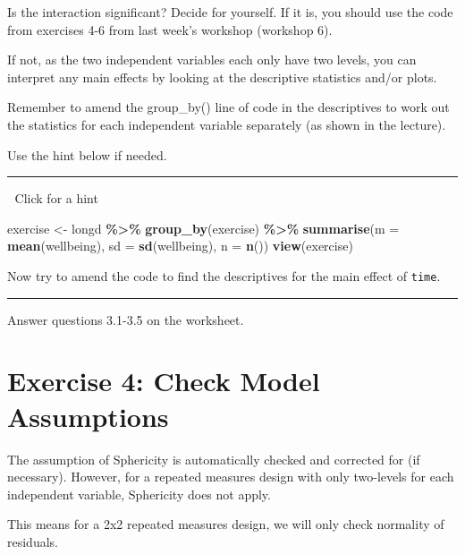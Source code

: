 \documentclass[
]{book}
\newenvironment{Shaded}{\begin{snugshade}}{\end{snugshade}}
\newcommand{\AttributeTok}[1]{\textcolor[rgb]{0.13,0.29,0.53}{#1}}
\newcommand{\FunctionTok}[1]{\textcolor[rgb]{0.13,0.29,0.53}{\textbf{#1}}}
\newcommand{\NormalTok}[1]{#1}
\newcommand{\OtherTok}[1]{\textcolor[rgb]{0.56,0.35,0.01}{#1}}
\newcommand{\SpecialCharTok}[1]{\textcolor[rgb]{0.81,0.36,0.00}{\textbf{#1}}}
\let\oldsection\section
\renewcommand{\section}{\needspace{5\baselineskip}\oldsection}
\begin{document}
Is the interaction significant? Decide for yourself. If it is, you should use the code from exercises 4-6 from last week's workshop (workshop 6).

If not, as the two independent variables each only have two levels, you can interpret any main effects by looking at the descriptive statistics and/or plots.

Remember to amend the group\_by() line of code in the descriptives to work out the statistics for each independent variable separately (as shown in the lecture).

Use the hint below if needed.

\begin{center}\rule{0.5\linewidth}{0.5pt}\end{center}

👀 Click for a hint

\begin{Shaded}
\begin{Highlighting}[]
\NormalTok{exercise }\OtherTok{\textless{}{-}}\NormalTok{ longd }\SpecialCharTok{\%\textgreater{}\%}
  \FunctionTok{group\_by}\NormalTok{(exercise) }\SpecialCharTok{\%\textgreater{}\%}
  \FunctionTok{summarise}\NormalTok{(}\AttributeTok{m =} \FunctionTok{mean}\NormalTok{(wellbeing), }
            \AttributeTok{sd =} \FunctionTok{sd}\NormalTok{(wellbeing), }
            \AttributeTok{n =} \FunctionTok{n}\NormalTok{())}
\FunctionTok{view}\NormalTok{(exercise)}
\end{Highlighting}
\end{Shaded}

Now try to amend the code to find the descriptives for the main effect of \texttt{time}.

\begin{center}\rule{0.5\linewidth}{0.5pt}\end{center}

Answer questions 3.1-3.5 on the worksheet.

\section{Exercise 4: Check Model Assumptions}\label{exercise-4-check-model-assumptions}

The assumption of Sphericity is automatically checked and corrected for (if necessary). However, for a repeated measures design with only two-levels for each independent variable, Sphericity does not apply.

This means for a 2x2 repeated measures design, we will only check normality of residuals.
\end{document}
